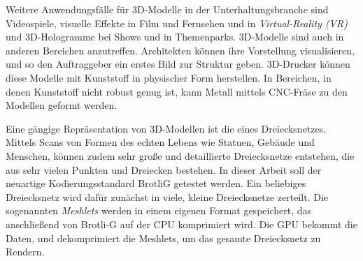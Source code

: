 Weitere Anwendungsfälle für 3D-Modelle in der Unterhaltungsbranche sind Videospiele, visuelle Effekte in Film und Fernsehen und in \textit{Virtual-Reality (VR)} und 3D-Hologramme bei Shows und in Themenparks. 
3D-Modelle sind auch in anderen Bereichen anzutreffen.
Architekten können ihre Vorstellung visualisieren, und so den Auftraggeber ein erstes Bild zur Struktur geben.
3D-Drucker können diese Modelle mit Kunststoff in physischer Form herstellen.
In Bereichen, in denen Kunststoff nicht robust genug ist, kann Metall mittels CNC-Fräse zu den Modellen geformt werden. \newline

Eine gängige Repräsentation von 3D-Modellen ist die eines Dreiecksnetzes.
Mittels Scans von Formen des echten Lebens wie Statuen, Gebäude und Menschen, können zudem sehr große und detaillierte Dreiecksnetze entstehen, die aus sehr vielen Punkten und Dreiecken bestehen.
In dieser Arbeit soll der neuartige Kodierungsstandard BrotliG getestet werden.
Ein beliebiges Dreiecksnetz wird dafür zunächst in viele, kleine Dreiecksnetze zerteilt.
Die sogenannten \textit{Meshlets} werden in einem eigenen Format gespeichert, das anschließend von Brotli-G auf der CPU komprimiert wird.
Die GPU bekommt die Daten, und dekomprimiert die Meshlets, um das gesamte Dreiecksnetz zu Rendern.